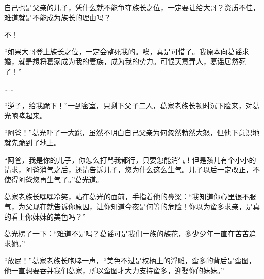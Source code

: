 \begin{this_body}
自己也是父亲的儿子，凭什么就不能争夺族长之位，一定要让给大哥？资质不佳，难道就是不能成为族长的理由吗？

不！

“如果大哥登上族长之位，一定会整死我的。唉，真是可惜了。我原本向葛谣求婚，就是想将葛家成为我的妻族，成为我的势力。可恨天意弄人，葛谣居然死了！”

……

“逆子，给我跪下！”一到密室，只剩下父子二人，葛家老族长顿时沉下脸来，对葛光咆哮起来。

“阿爸！”葛光吓了一大跳，虽然不明白自己父亲为何忽然勃然大怒，但他下意识地就先跪到了地上。

“阿爸，我是你的儿子，你怎么打骂我都行，只要您能消气！但是孩儿有个小小的请求，阿爸消气之后，还请告诉儿子，您为什么这么生气。儿子以后一定改正，不使得阿爸您再生气了。”葛光道。

葛家老族长嘿嘿冷笑，站在葛光的面前，手指着他的鼻梁：“我知道你心里很不服气，为父现在就告诉你原因，让你知道今夜是何等的危险！你以为蛮多求亲，是真的看上你妹妹的美色吗？”

葛光楞了一下：“难道不是吗？葛谣可是我们一族的族花，多少少年一直在苦苦追求她。”

“放屁！”葛家老族长咆哮一声，“美色不过是权柄上的浮雕，蛮多的背后是蛮图，他一直想要吞并我们葛家，所以蛮图才大力支持蛮多，迎娶你的妹妹。”

\end{this_body}


